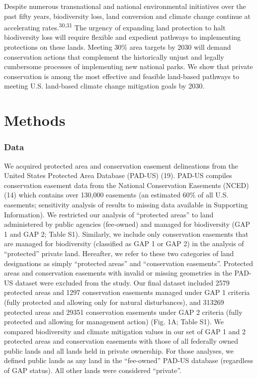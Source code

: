 \documentclass[3p]{elsarticle} %
\begin{document}
Despite numerous transnational and national environmental initiatives
over the past fifty years, biodiversity loss, land conversion and
climate change continue at accelerating rates.\textsuperscript{30,31}
The urgency of expanding land protection to halt biodiversity loss will
require flexible and expedient pathways to implementing protections on
these lands. Meeting 30\% area targets by 2030 will demand conservation
actions that complement the historically unjust and legally cumbersome
processes of implementing new national parks. We show that private
conservation is among the most effective and feasible land-based
pathways to meeting U.S. land-based climate change mitigation goals by
2030.

\hypertarget{methods}{%
\section{Methods}\label{methods}}

\hypertarget{data}{%
\subsubsection{Data}\label{data}}

We acquired protected area and conservation easement delineations from
the United States Protected Area Database (PAD-US) (19). PAD-US compiles
conservation easement data from the National Conservation Easements
(NCED) (14) which contains over 130,000 easements (an estimated 60\% of
all U.S. easements; sensitivity analysis of results to missing data
available in Supporting Information). We restricted our analysis of
``protected areas'' to land administered by public agencies (fee-owned)
and managed for biodiversity (GAP 1 and GAP 2; Table S1). Similarly, we
include only conservation easements that are managed for biodiversity
(classified as GAP 1 or GAP 2) in the analysis of ``protected'' private
land. Hereafter, we refer to these two categories of land designations
as simply ``protected areas'' and ``conservation easements''. Protected
areas and conservation easements with invalid or missing geometries in
the PAD-US dataset were excluded from the study. Our final dataset
included 2579 protected areas and 1297 conservation easements managed
under GAP 1 criteria (fully protected and allowing only for natural
disturbances), and 313269 protected areas and 29351 conservation
easements under GAP 2 criteria (fully protected and allowing for
management action) (Fig. 1A; Table S1). We compared biodiversity and
climate mitigation values in our set of GAP 1 and 2 protected areas and
conservation easements with those of all federally owned public lands
and all lands held in private ownership. For those analyses, we defined
public lands as any land in the ``fee-owned'' PAD-US database
(regardless of GAP status). All other lands were considered ``private''.
\end{document}
